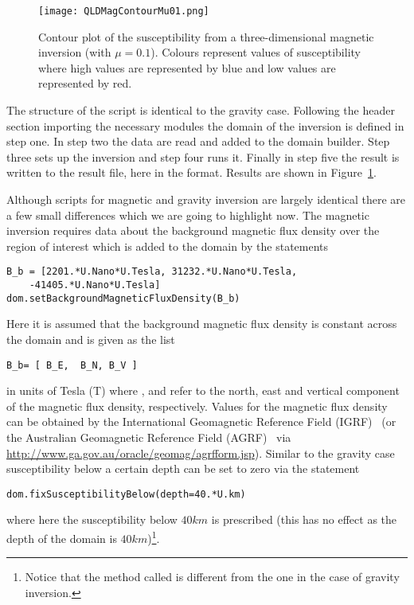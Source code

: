 \begin{figure}
\centering
\texttt{[image: QLDMagContourMu01.png]}
\caption{Contour plot of the susceptibility from a three-dimensional magnetic inversion (with $\mu=0.1$).
Colours represent values of susceptibility where high values are represented by
    blue and low values are represented by red.}
\label{FIG:P1:MAG:1}
\end{figure}

The structure of the script is identical to the gravity case.
Following the header section importing the necessary modules the domain of the
inversion is defined in step one.
In step two the data are read and added to the domain builder.
Step three sets up the inversion and step four runs it.
Finally in step five the result is written to the result file, here
 in the \VTK format.
Results are shown in Figure~\ref{FIG:P1:MAG:1}.

Although scripts for magnetic and gravity inversion are largely identical there
are a few small differences which we are going to highlight now.
The magnetic inversion requires data about the background magnetic flux density
over the region of interest which is added to the domain by the statements 
\begin{verbatim}
B_b = [2201.*U.Nano*U.Tesla, 31232.*U.Nano*U.Tesla,  
    -41405.*U.Nano*U.Tesla]
dom.setBackgroundMagneticFluxDensity(B_b)
\end{verbatim}
Here it is assumed that the background magnetic flux density is constant across
the domain and is given as the list
\begin{verbatim}
B_b= [ B_E,  B_N, B_V ]
\end{verbatim}
in units of Tesla (T) where 
,  and  refer to the north, east and
vertical component of the magnetic flux density, respectively.
Values for the magnetic flux density can be obtained by the International
Geomagnetic Reference Field (IGRF)~\cite{IGRF} (or the Australian Geomagnetic
Reference Field (AGRF)~\cite{AGRF} via \url{http://www.ga.gov.au/oracle/geomag/agrfform.jsp}).
Similar to the gravity case susceptibility below a certain depth can be set to
zero via the statement
\begin{verbatim}
dom.fixSusceptibilityBelow(depth=40.*U.km)
\end{verbatim}
where here the susceptibility below $40km$ is prescribed (this has no effect as
the depth of the domain is $40km$)\footnote{Notice that the method called is
different from the one in the case of gravity inversion.}. 

